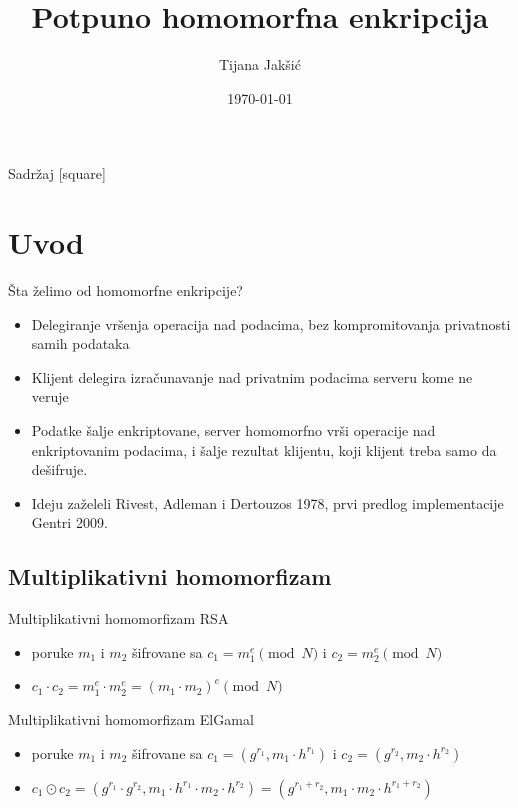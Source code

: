 \documentclass[aspectratio=1610]{beamer}
\title{Potpuno homomorfna enkripcija}
\author{Tijana Jak\v si\' c}
\date{\today}
\begin{document}
\begin{frame}
\titlepage
\end{frame}


\begin{frame}{Sadržaj}
\begingroup
{}[square]
\tableofcontents
\endgroup
\end{frame}

\section{Uvod}
\begin{frame}{\v Sta \v zelimo od homomorfne enkripcije?}
    \begin{itemize}
        \item Delegiranje vršenja operacija nad podacima, bez kompromitovanja privatnosti samih podataka
        \item Klijent delegira izračunavanje nad privatnim podacima serveru kome ne veruje
        \item Podatke šalje enkriptovane, server homomorfno vrši operacije nad enkriptovanim podacima, i šalje rezultat klijentu, koji klijent treba samo da dešifruje.
        \item Ideju za\v zeleli Rivest, Adleman i Dertouzos 1978, prvi predlog implementacije Gentri 2009.
    \end{itemize}
\end{frame}

\subsection{Multiplikativni homomorfizam}
\begin{frame}{Multiplikativni homomorfizam RSA}
    \begin{itemize}
        \item poruke $m_1$ i $m_2$ \v sifrovane sa $c_1 = m_1^e\pmod{N}$ i $c_2 = m_2^e\pmod{N}$
        \item $c_1\cdot c_2 = m_1^e\cdot m_2^e = (m_1\cdot m_2)^e \pmod{N}$
    \end{itemize}
\end{frame}

\begin{frame}{Multiplikativni homomorfizam ElGamal}
    \begin{itemize}
        \item poruke $m_1$ i $m_2$ \v sifrovane sa $c_1 = (g^{r_1},m_1\cdot h^{r_1})$ i $c_2 = (g^{r_2},m_2\cdot h^{r_2})$
        \item $c_1\odot c_2 = (g^{r_1}\cdot g^{r_2}, m_1\cdot h^{r_1}\cdot m_2\cdot h^{r_2}) = (g^{r_1 + r_2}, m_1\cdot m_2\cdot h^{r_1+r_2})$
    \end{itemize}
\end{frame}
\end{document}
